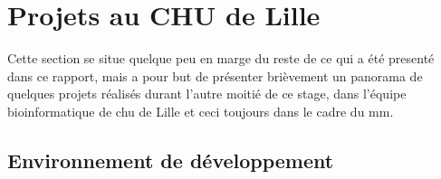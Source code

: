 \chapter{Projets au CHU de Lille}

Cette section se situe quelque peu en marge du reste de ce qui a été presenté dans ce rapport, mais a pour 
but de présenter brièvement un panorama de quelques projets réalisés durant l'autre moitié de ce stage, 
dans l'équipe bioinformatique de \gls{chu} de Lille et ceci toujours dans le cadre du \gls{mm}.

\section{Environnement de développement}

